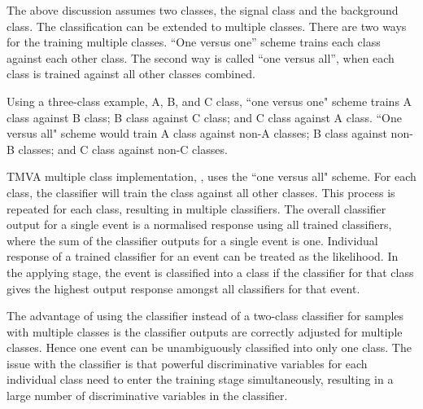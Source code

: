 The above discussion  assumes two classes, the signal class and the background class. The classification can be extended to multiple classes. There are two ways for the training multiple classes. ``One versus one'' scheme trains each class against each other class. The second way is called ``one versus all'', when each class is trained against all other classes combined.

Using a three-class example, A, B, and C class, ``one versus one" scheme trains A class against B class; B class against C class; and C class against A class.  ``One versus all" scheme would train A class against non-A classes; B class against non-B classes; and C class against non-C classes.


TMVA multiple class implementation, \multiclass, uses the ``one versus all" scheme. For each class, the \multiclass classifier will train the class against all other classes. This process is repeated for each class, resulting in multiple classifiers. The overall classifier output for a single event is a normalised response using all trained classifiers, where the sum of the classifier outputs for a single event is one. Individual response of a trained classifier for an event can be treated as the likelihood. In the applying stage, the event is classified into a class if the classifier for that class gives the highest output response amongst all classifiers for that event.

The advantage of using the \multiclass classifier instead of a two-class classifier for samples with multiple classes  is the classifier outputs are correctly adjusted for multiple classes. Hence one event can  be unambiguously classified into only one class. The issue with the \multiclass classifier is that powerful discriminative variables for each individual class need to enter the training stage simultaneously, resulting in a large number of discriminative variables in the  \multiclass classifier.


